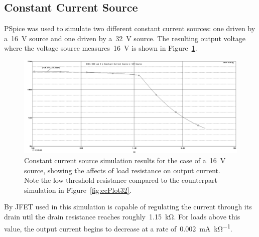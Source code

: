 \subsection{Constant Current Source}
PSpice was used to simulate two different constant current sources: one driven
by a~\SI{16}{\volt} source and one driven by a~\SI{32}{\volt} source.  The
resulting output voltage where the voltage source measures~\SI{16}{\volt} is
shown in Figure~\ref{fig:ccPlot16}.
%
\begin{figure}[H]
	\centering
	\includegraphics[width=\pwidth]{img/plot/constantCurrent16Plot.PNG}
	\parbox{\pwidth}{
	\caption[PSpice Plot --- Constant Current Source (\SI{16}{\volt})]{Constant
		current source simulation results for the case of a~\SI{16}{\volt}
		source, showing the affects of load resistance on output current.  Note
		the low threshold resistance compared to the counterpart simulation in
		Figure~\ref{fig:ccPlot32}.}
	\label{fig:ccPlot16}}
\end{figure}
%
By JFET used in this simulation is capable of regulating the current through
its drain util the drain resistance reaches roughly~\SI{1.15}{\kilo\ohm}.  For
loads above this value, the output current begins to decrease at a rate
of~\SI{0.002}{\milli\ampere\per\kilo\ohm}.

